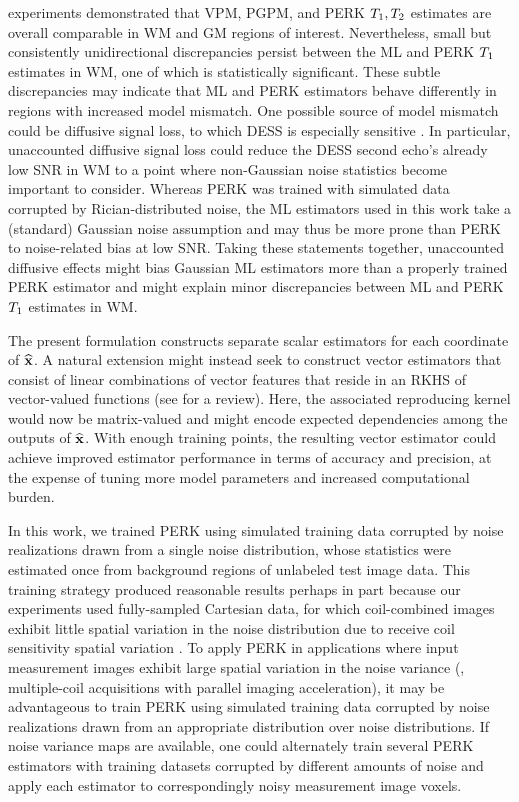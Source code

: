 \Invivo experiments demonstrated
that VPM, PGPM, and PERK $T_1,T_2$ estimates
are overall comparable
in WM and GM regions of interest.
Nevertheless,
small but consistently unidirectional discrepancies persist
between the ML and PERK $T_1$ estimates in WM,
one of which is statistically significant. 
These subtle discrepancies may indicate
that ML and PERK estimators behave differently
in regions with increased model mismatch.
One possible source 
of \invivo model mismatch
could be diffusive signal loss,
to which DESS is especially sensitive 
\cite{wu:90:eod,carney:91:asa}.
In particular,
unaccounted diffusive signal loss
could reduce the DESS second echo's already low SNR in WM
to a point where non-Gaussian noise statistics
become important to consider.
Whereas PERK was trained 
with simulated data
corrupted by Rician-distributed noise,
the ML estimators used in this work
take a (standard) Gaussian noise assumption
and may thus be more prone than PERK
to noise-related bias at low SNR.
Taking these statements together,
unaccounted diffusive effects 
might bias Gaussian ML estimators more
than a properly trained PERK estimator
and might explain minor discrepancies
between ML and PERK $T_1$ estimates in WM.

The present formulation 
constructs separate scalar estimators
for each coordinate of $\widehat{\mathbf{x}}$. 
A natural extension might instead seek 
to construct vector estimators
that consist of linear combinations
of vector features
that reside in an RKHS
of vector-valued functions
(see \cite{alvarez:11:kfv}
for a review).
Here,
the associated reproducing kernel
would now be matrix-valued 
and might encode expected dependencies
among the outputs of $\widehat{\mathbf{x}}$.
With enough training points,
the resulting vector estimator
could achieve improved estimator performance
in terms of accuracy and precision,
at the expense of tuning more model parameters
and increased computational burden.

In this work,
we trained PERK 
using simulated training data
corrupted by noise realizations 
drawn from a single noise distribution,
whose statistics were estimated once
from background regions
of unlabeled test image data.
This training strategy
produced reasonable results
perhaps in part 
because our experiments 
used fully-sampled Cartesian data,
for which coil-combined images
exhibit little spatial variation
in the noise distribution 
due to receive coil sensitivity 
spatial variation \cite{ajafernandez:16:sao}.
To apply PERK in applications
where input measurement images
exhibit large spatial variation
in the noise variance
(\eg, multiple-coil acquisitions
with parallel imaging acceleration),
it may be advantageous 
to train PERK
using simulated training data
corrupted by noise realizations
drawn from an appropriate distribution 
over noise distributions.
If noise variance maps are available,
one could alternately 
train several PERK estimators 
with training datasets 
corrupted by different amounts of noise
and apply each estimator 
to correspondingly noisy measurement image voxels.

